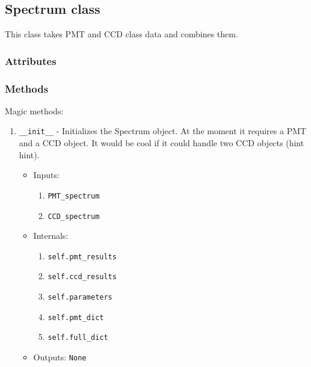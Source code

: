 \documentclass{article}
\newcommand{\code}{\texttt}
\begin{document}
\subsection{Spectrum class}
\indent \indent This class takes PMT and CCD class data and combines them. 
\subsubsection{Attributes}
\subsubsection{Methods}
Magic methods:
\begin{enumerate}
	\item \code{\_\_init\_\_} - Initializes the Spectrum object. At the moment it requires a PMT and a CCD object.  It would be cool if it could handle two CCD objects (hint hint).
	\begin{itemize}
		\item Inputs: 
		\begin{enumerate}
			\item \code{PMT\_spectrum}
			\item \code{CCD\_spectrum}
		\end{enumerate}
		\item Internals:
		\begin{enumerate}
			\item \code{self.pmt\_results}
			\item \code{self.ccd\_results}
			\item \code{self.parameters}
			\item \code{self.pmt\_dict}
			\item \code{self.full\_dict}
		\end{enumerate}
		\item Outputs: \code{None}
	\end{itemize}
\end{enumerate}
\end{document}
